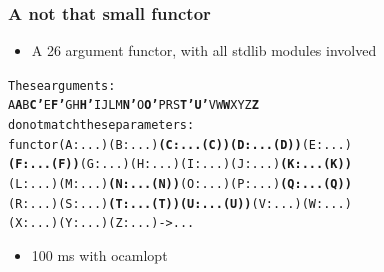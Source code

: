 \documentclass[11pt,aspectratio=169]{beamer}
\begin{document}
\begin{frame}[fragile]\frametitle{A not that small functor}
  \begin{itemize}
    \item A 26 argument functor, with all stdlib modules involved
  \end{itemize}
\begin{alltt}
These arguments:
  {\color{green}{}A} {\color{red}{}\bfseries{}A} {\color{green}{}B} {\color{magenta}{}\bfseries{}C'} {\color{red}{}\bfseries{}} {\color{green}{}E} {\color{magenta}{}\bfseries{}F'} {\color{green}{}G} {\color{green}{}H} {\color{red}{}\bfseries{}H'} {\color{green}{}I} {\color{green}{}J} {\color{red}{}\bfseries{}} {\color{green}{}L} {\color{green}{}M} {\color{magenta}{}\bfseries{}N'} {\color{green}{}O} {\color{red}{}\bfseries{}O'} {\color{green}{}P} {\color{red}{}\bfseries{}} {\color{green}{}R} {\color{green}{}S} {\color{magenta}{}\bfseries{}T'} {\color{magenta}{}\bfseries{}U'} {\color{green}{}V} {\color{green}{}W} {\color{red}{}\bfseries{}W} {\color{green}{}X} {\color{green}{}Y} {\color{green}{}Z} {\color{red}{}\bfseries{}Z}
do not match these parameters:
  functor {\color{green}{}(A : ...)} {\color{red}{}\bfseries{}} {\color{green}{}(B : ...)} {\color{magenta}{}\bfseries{}(C : ...(C))} {\color{red}{}\bfseries{}(D : ...(D))} {\color{green}{}(E : ...)}
  {\color{magenta}{}\bfseries{}(F : ...(F))} {\color{green}{}(G : ...)} {\color{green}{}(H : ...)} {\color{red}{}\bfseries{}} {\color{green}{}(I : ...)} {\color{green}{}(J : ...)} {\color{red}{}\bfseries{}(K : ...(K))}
  {\color{green}{}(L : ...)} {\color{green}{}(M : ...)} {\color{magenta}{}\bfseries{}(N : ...(N))} {\color{green}{}(O : ...)} {\color{red}{}\bfseries{}} {\color{green}{}(P : ...)} {\color{red}{}\bfseries{}(Q : ...(Q))}
  {\color{green}{}(R : ...)} {\color{green}{}(S : ...)} {\color{magenta}{}\bfseries{}(T : ...(T))} {\color{magenta}{}\bfseries{}(U : ...(U))} {\color{green}{}(V : ...)} {\color{green}{}(W : ...)} {\color{red}{}\bfseries{}}
  {\color{green}{}(X : ...)} {\color{green}{}(Y : ...)} {\color{green}{}(Z : ...)} {\color{red}{}\bfseries{}} -> ...
\end{alltt}

  \begin{itemize}
    \item 100 ms with ocamlopt
  \end{itemize}

\end{frame}
\end{document}
